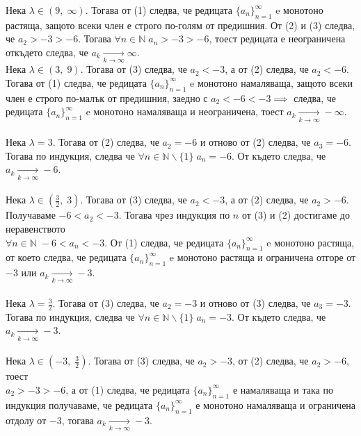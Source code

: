 \documentclass[12pt]{article}
\newcommand{\N}{\mathbb{N}}
\begin{document}
Нека $\lambda \in (9, \; \infty)$. Тогава от (1) следва, че редицата $\{a_n\}_{n = 1}^\infty$ e монотоно растяща, защото всеки член е строго по-голям от предишния.
От (2) и (3) следва, че $a_2 > -3 > -6$. Тогава $\forall n \in \N \; a_n > -3 > -6$, тоест редицата е неограничена откъдето следва, че $a_k \underset{k \to \infty}{\to} \infty$. \\

Нека $\lambda \in (3, \; 9)$. Тогава от (3) следва, че $a_2 < -3$, а от (2) следва, че $a_2 < -6$. Тогава от (1) следва, че редицата $\{a_n\}_{n = 1}^\infty$ e монотоно намаляваща, защото всеки член е строго по-малък от предишния, заедно с $a_2 < -6 < -3 \implies$ следва,
че редицата $\{a_n\}_{n = 1}^\infty$ e монотоно намаляваща и неограничена, тоест $ a_k \underset{k \to \infty}{\to} -\infty$. \\\\

Нека $\lambda = 3$. Тогава от (2) следва, че $a_2 = -6$ и отново от (2) следва, че $a_3 = -6$. Тогава по индукция, следва че $\forall n \in \N\backslash\{1\} \; a_n = -6$. От където следва, че $a_k \underset{k \to \infty}{\to} -6$. \\\\

Нека $\lambda \in \left(\frac{3}{2}, \; 3\right)$. Тогава от (3) следва, че $a_2 < -3$, а от (2) следва, че $a_2 > -6$. Получаваме $-6 < a_2 < -3$. Тогава чрез индукция по $n$ от (3) и (2) достигаме до неравенството \\

$\forall n \in \N \; -6 < a_n < -3$. От (1) следва, че редицата $\{a_n\}_{n = 1}^\infty$ e монотоно растяща, от което следва, че редицата $\{a_n\}_{n = 1}^\infty$ e монотоно растяща и ограничена отгоре от $-3$ или $a_k \underset{k \to \infty}{\to} -3$. \\\\

Нека $\lambda = \frac{3}{2}$. Тогава от (3) следва, че $a_2 = -3$ и отново от (3) следва, че $a_3 = -3$. Тогава по индукция, следва че $\forall n \in \N\backslash\{1\} \; a_n = -3$. От където следва, че $a_k \underset{k \to \infty}{\to} -3$. \\\\

Нека $\lambda \in \left(-3, \; \frac{3}{2}\right)$. Тогава от (3) следва, че $a_2 > -3$, от (2) следва, че $a_2 > -6$, тоест \\

$a_2 > -3 > -6$, а от (1) следва, че редицата $\{a_n\}_{n = 1}^\infty$ е намаляваща и така по индукция получаваме, че редицата $\{a_n\}_{n = 1}^\infty$ е монотоно намаляваща и ограничена отдолу от $-3$, тогава $a_k \underset{k \to \infty}{\to} -3$. \\\\
\end{document}
